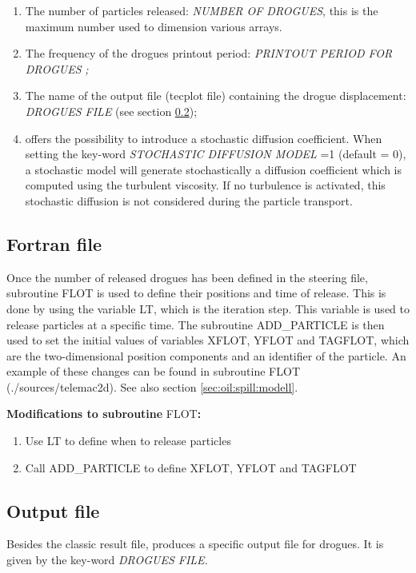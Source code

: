 \begin{enumerate}
\item  The number of particles released: \textit{NUMBER OF DROGUES}, this is the maximum number used to dimension various arrays.

\item  The frequency of the drogues printout period: \textit{PRINTOUT PERIOD FOR DROGUES} \textit{;}

\item  The name of the output file (tecplot file) containing the drogue displacement: \textit{DROGUES FILE} (see section \ref{subs:drog:output:file});

\item  {} offers the possibility to introduce a stochastic diffusion coefficient. When setting the key-word \textit{STOCHASTIC DIFFUSION MODEL} =1 (default = 0), a stochastic model will generate stochastically a diffusion coefficient which is computed using the turbulent viscosity. If no turbulence is activated, this stochastic diffusion is not considered during the particle transport.
\end{enumerate}

\subsection{ Fortran file}
\label{subs:drog:fortr:file}
 Once the number of released drogues has been defined in the steering file, subroutine FLOT is used to define their positions and time of release. This is done by using the variable LT, which is the iteration step. This variable is used to release particles at a specific time. The subroutine ADD\_PARTICLE is then used to set the initial values of variables XFLOT, YFLOT and TAGFLOT, which are the two-dimensional position components and an identifier of the particle. An example of these changes can be found in subroutine FLOT (./sources/telemac2d). See also section \ref{sec:oil:spill:modell}.

 \textbf{Modifications to subroutine }FLOT\textbf{:}

\begin{enumerate}
\item \textbf{ }Use LT to define when to release particles

\item  Call ADD\_PARTICLE to define XFLOT, YFLOT and TAGFLOT
\end{enumerate}


\subsection{ Output file}
\label{subs:drog:output:file}
 Besides the classic result file,  produces a specific output file for drogues. It is given by the key-word \textit{DROGUES FILE. }

